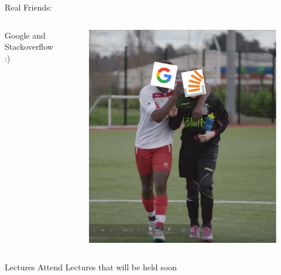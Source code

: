     \begin{frame}{Real Friends:}
    \begin{columns}
        Google and Stackoverflow :)
        \begin{figure}
        \includegraphics[width=1\textwidth]{imgs/friends.jpg}
        \end{figure}
        \end{columns}
    \end{frame}
    \begin{frame}{Lectures}
        \uncover<+-> { Attend Lectures that will be held soon}    
    \end{frame}
